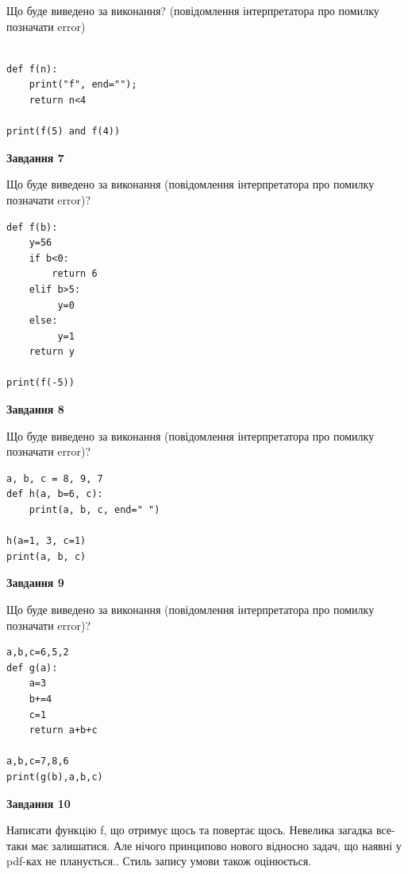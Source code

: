\documentclass[12pt, ukrainian]{article}
\begin{document}
{\begin {large}
Що буде виведено за виконання? (повідомлення інтерпретатора про помилку позначати error)\par
\begin{verbatim}

def f(n):
    print("f", end="");
    return n<4

print(f(5) and f(4))
\end{verbatim}

{\begin {center}\textbf{Завдання 7}\end {center}}

Що буде виведено за виконання (повідомлення інтерпретатора про помилку позначати error)?\par
\begin{verbatim}
def f(b):
    y=56
    if b<0: 
        return 6
    elif b>5:
         y=0
    else:
         y=1
    return y

print(f(-5))
\end{verbatim}

{\begin {center}\textbf{Завдання 8}\end {center}}

Що буде виведено за виконання (повідомлення інтерпретатора про помилку позначати error)?\par
\begin{verbatim}
a, b, c = 8, 9, 7
def h(a, b=6, c):
    print(a, b, c, end=" ")

h(a=1, 3, c=1)
print(a, b, c)
\end{verbatim}

{\begin {center}\textbf{Завдання 9}\end {center}}

Що буде виведено за виконання (повідомлення інтерпретатора про помилку позначати error)?\par
\begin{verbatim}
a,b,c=6,5,2
def g(a):
    a=3
    b+=4
    c=1
    return a+b+c

a,b,c=7,8,6
print(g(b),a,b,c)
\end{verbatim}

{\begin {center}\textbf{Завдання 10}\end {center}}


Написати функцiю f, що отримує щось та повертає щось. Невелика загадка все-таки має залишатися. Але нічого принципово нового відносно задач, що наявні у pdf-ках не планується.. Стиль запису умови також оцінюється.\par
\end {large}}
\newpage
\end{document}

